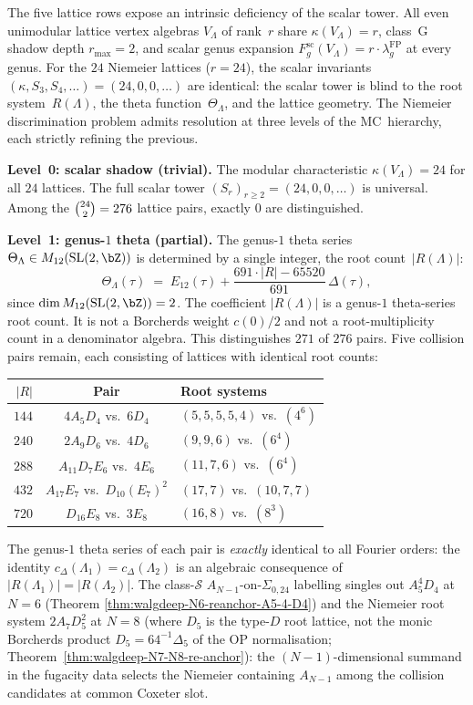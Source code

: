 The five lattice rows expose an intrinsic deficiency of the scalar tower.
All even unimodular lattice vertex algebras $V_\Lambda$ of rank~$r$
share $\kappa(V_\Lambda) = r$, class~G shadow depth $r_{\max} = 2$,
and scalar genus expansion
$F_g^{\mathrm{sc}}(V_\Lambda) = r \cdot \lambda_g^{\mathrm{FP}}$
at every genus.
For the $24$ Niemeier lattices ($r = 24$), the scalar invariants
$(\kappa, S_3, S_4, \ldots) = (24, 0, 0, \ldots)$ are identical:
the scalar tower is blind to the root
system~$R(\Lambda)$, the theta function~$\Theta_\Lambda$, and
the lattice geometry.
The Niemeier discrimination problem
admits resolution at three levels of the MC~hierarchy, each strictly
refining the previous.

\medskip
\noindent\textbf{Level~0: scalar shadow (trivial).}\;
The modular characteristic $\kappa(V_\Lambda) = 24$ for all
$24$ lattices.
The full scalar tower $(S_r)_{r \geq 2} = (24, 0, 0, \ldots)$
is universal.
Among the $\tbinom{24}{2} = 276$ lattice pairs, exactly $0$
are distinguished.

\medskip
\noindent\textbf{Level~1: genus-$1$ theta (partial).}\;
The genus-$1$ theta series $\Theta_\Lambda \in M_{12}(\mathrm{SL}(2,\bZ))$
is determined by a single integer, the root count~$|R(\Lambda)|$:
\[
 \Theta_\Lambda(\tau) \;=\; E_{12}(\tau)
 + \frac{691\cdot|R| - 65520}{691}\,\Delta(\tau),
\]
since $\dim M_{12}(\mathrm{SL}(2,\bZ)) = 2$.
The coefficient $|R(\Lambda)|$ is a genus-$1$ theta-series root count.
It is not a Borcherds weight $c(0)/2$ and not a root-multiplicity
count in a denominator algebra.
This distinguishes $271$ of $276$ pairs.
Five collision pairs remain, each consisting of lattices with
identical root counts:
\begin{center}
\small
\renewcommand{\arraystretch}{1.2}
\begin{tabular}{rcl}
\toprule
$|R|$ & \textbf{Pair} & \textbf{Root systems}\\
\midrule
$144$ & $4A_5 D_4$ vs.\ $6D_4$
 & $(5,5,5,5,4)$ vs.\ $(4^6)$\\
$240$ & $2A_9 D_6$ vs.\ $4D_6$
 & $(9,9,6)$ vs.\ $(6^4)$\\
$288$ & $A_{11} D_7 E_6$ vs.\ $4E_6$
 & $(11,7,6)$ vs.\ $(6^4)$\\
$432$ & $A_{17} E_7$ vs.\ $D_{10}(E_7)^2$
 & $(17,7)$ vs.\ $(10,7,7)$\\
$720$ & $D_{16} E_8$ vs.\ $3E_8$
 & $(16,8)$ vs.\ $(8^3)$\\
\bottomrule
\end{tabular}
\end{center}
The genus-$1$ theta series of each pair is
\emph{exactly} identical to all Fourier orders: the identity
$c_\Delta(\Lambda_1) = c_\Delta(\Lambda_2)$ is
an algebraic consequence of $|R(\Lambda_1)| = |R(\Lambda_2)|$.
The class-$\mathcal S$ $A_{N-1}$-on-$\Sigma_{0,24}$ labelling
singles out $A_5^4 D_4$ at $N = 6$ (Theorem
\ref{thm:walgdeep-N6-reanchor-A5-4-D4}) and the Niemeier root system
$2 A_7 D_5^2$ at $N = 8$ (where $D_5$ is the type-$D$ root lattice,
not the monic Borcherds product $D_5=64^{-1}\Delta_5$ of the OP
normalisation; Theorem~\ref{thm:walgdeep-N7-N8-re-anchor}): the
$(N-1)$-dimensional summand in the fugacity data selects the
Niemeier containing $A_{N-1}$ among the collision candidates
at common Coxeter slot.

